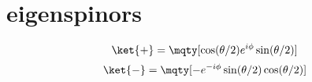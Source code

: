 \section*{eigenspinors}
\[\ket{+}=\mqty[\cos(\theta/2) \\ e^{i\phi}\sin(\theta/2)]\]
\[\ket{-}=\mqty[ -e^{-i\phi}\sin(\theta/2) \\ \cos(\theta/2) ]\]